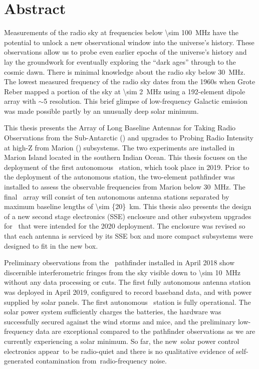 \section*{Abstract}
	
Measurements of the radio sky at frequencies below \SI{\sim 100}{\mega \hertz} have the potential to unlock a new observational window into the universe’s history. These observations allow us to probe even earlier epochs of the universe’s history and lay the groundwork for eventually exploring the “dark ages” through to the cosmic dawn. There is minimal knowledge about the radio sky below \SI{30}{\mega \hertz}. The lowest measured frequency of the radio sky dates from the 1960s when Grote Reber mapped a portion of the sky at \SI{\sim 2}{\mega \hertz} using a 192-element dipole array with $\sim$5 \degree resolution. This brief glimpse of low-frequency Galactic emission was made possible partly by an unusually deep solar minimum.

This thesis presents the Array of Long Baseline Antennas for Taking Radio Observations from the Sub-Antarctic (\albatros) and upgrades to Probing Radio Intensity at high-Z from Marion (\prizm) subsystems. The two experiments are installed in Marion Island located in the southern Indian Ocean.  This thesis focuses on the deployment of the first autonomous \albatros\ station, which took place in 2019. Prior to the deployment of the autonomous station, the two-element pathfinder was installed to assess the observable frequencies from Marion below \SI{30}{\mega \hertz}. The final \albatros\ array will consist of ten autonomous antenna stations separated by maximum baseline lengths of \SI{\sim {20}}{km}. This thesis also presents the design of a new second stage electronics (SSE) enclosure and other subsystem upgrades for \prizm\ that were intended for the 2020 deployment. The enclosure was revised so that each antenna is serviced by its SSE box and more compact subsystems were designed to fit in the new box.

Preliminary observations from the \albatros\ pathfinder installed in April 2018 show discernible interferometric fringes from the sky visible down to \SI{\sim 10}{\mega \hertz} without any data processing or cuts. The first fully autonomous antenna station was deployed in April 2019, configured to record baseband data, and with power supplied by solar panels. The first autonomous \albatros\ station is fully operational. The solar power system sufficiently charges the batteries, the hardware was successfully secured against the wind storms and mice, and the preliminary low-frequency data are exceptional compared to the pathfinder observations as we are currently experiencing a solar minimum. So far, the new solar power control electronics appear to be radio-quiet and there is no qualitative evidence of self-generated contamination from radio-frequency noise.
